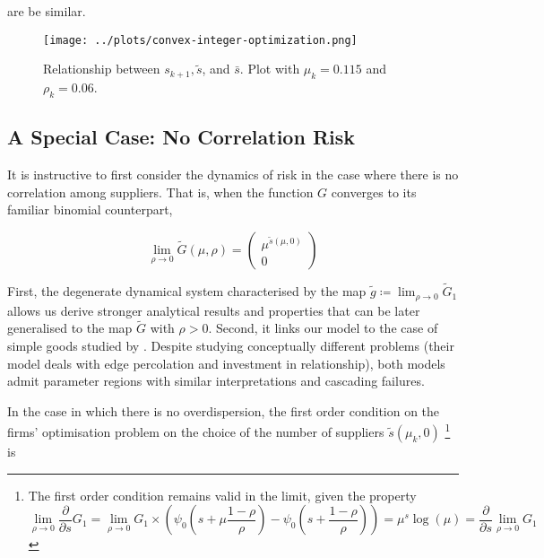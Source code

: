 \documentclass[../../main.tex]{subfiles}
\begin{document}
  are be similar.


  \begin{figure}[H]
    \centering
    \texttt{[image: ../plots/convex-integer-optimization.png]}
    \caption{Relationship between $s_{k + 1}, \tilde{s}$, and $\bar{s}$. Plot with $\mu_k = 0.115$ and $\rho_k = 0.06$.}
    \label{fig:convex-integer-optimization}
  \end{figure}
\fi

\subsection{A Special Case: No Correlation Risk}

It is instructive to first consider the dynamics of risk in the case where there is no correlation among suppliers. That is, when the function $G$ converges to its familiar binomial counterpart,

\begin{equation}
   \lim_{\rho \rightarrow 0} \tilde{G}(\mu, \rho) = \begin{pmatrix} \mu^{\tilde{s}(\mu, 0)} \\ 0 \end{pmatrix} 
\end{equation}

First, the degenerate dynamical system characterised by the map $\tilde{g} \coloneqq \lim_{\rho \to 0} \tilde{G}_1$ allows us derive stronger analytical results and properties that can be later generalised to the map $\tilde{G}$ with $\rho > 0$. Second, it links our model to the case of simple goods studied by . Despite studying conceptually different problems (their model deals with edge percolation and investment in relationship), both models admit parameter regions with similar interpretations and cascading failures.

In the case in which there is no overdispersion, the first order condition on the firms' optimisation problem on the choice of the number of suppliers $\tilde{s}(\mu_k, 0)$ \footnote{
  The first order condition remains valid in the limit, given the property
  \begin{equation}
    \lim_{\rho \rightarrow 0} \frac{\partial}{\partial s}G_1 = \lim_{\rho \rightarrow 0} G_1 \times \left(\psi_0\left(s + \mu \frac{1 - \rho}{\rho} \right) - \psi_0\left(s + \frac{1 - \rho}{\rho} \right) \right) = \mu^{s} \log(\mu) = \frac{\partial}{\partial s} \lim_{\rho \rightarrow 0} G_1
  \end{equation}
} is
\end{document}
